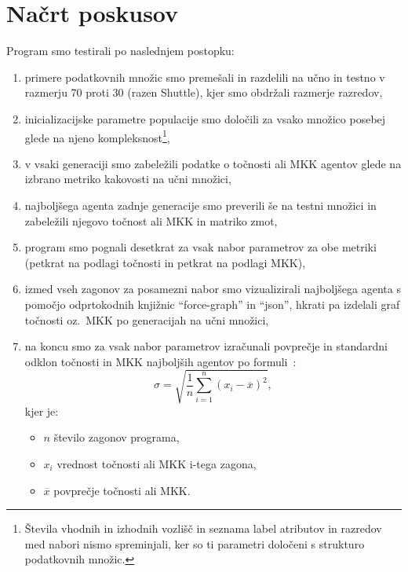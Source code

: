 \documentclass[a4paper,12pt,openright]{book}
\begin{document}
    \section{Načrt poskusov}\label{sec:nacrt-poskusov}
    Program smo testirali po naslednjem postopku:
    \begin{enumerate}
        \item primere podatkovnih množic smo premešali in razdelili na učno in testno v razmerju 70 proti 30 (razen Shuttle), kjer smo obdržali razmerje razredov,
        \item inicializacijske parametre populacije smo določili za vsako množico posebej glede na njeno kompleksnost\footnote{Števila vhodnih in izhodnih vozlišč in seznama label atributov in razredov med nabori nismo spreminjali, ker so ti parametri določeni s strukturo podatkovnih množic.},
        \item v vsaki generaciji smo zabeležili podatke o točnosti ali MKK agentov glede na izbrano metriko kakovosti na učni množici,
        \item najboljšega agenta zadnje generacije smo preverili še na testni množici in zabeležili njegovo točnost ali MKK in matriko zmot,
        \item program smo pognali desetkrat za vsak nabor parametrov za obe metriki (petkrat na podlagi točnosti in petkrat na podlagi MKK),
        \item izmed vseh zagonov za posamezni nabor smo vizualizirali naj\-bolj\-še\-ga agenta s pomočjo odprtokodnih knjižnic \enquote{force-graph}\cite{Vasturiano}
        in \enquote{json}\cite{Lohmann_JSON_for_Modern_2023}, hkrati pa izdelali graf točnosti oz.\ MKK po generacijah na učni množici,
        \item na koncu smo za vsak nabor parametrov izračunali povprečje in standardni odklon točnosti in MKK najboljših agentov po formuli~\cite{enwiki:1168408775}:
        \begin{equation}
            \sigma=\sqrt{\frac{1}{n}\sum_{i=1}^{n}(x_i-\overline{x})^2},
            \label{eq:standardni_odklon}
        \end{equation}
        kjer je:
        \begin{itemize}
            \item $n$ število zagonov programa,
            \item $x_i$ vrednost točnosti ali MKK i-tega zagona,
            \item $\overline{x}$ povprečje točnosti ali MKK.
        \end{itemize}
    \end{enumerate}
\end{document}
